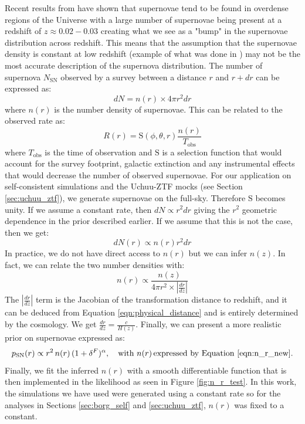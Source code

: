 Recent results from \cite{Lordet_2026} have shown that supernovae tend to be found in overdense regions of the Universe with a large number of supernovae being present at a 
redshift of $z \approx 0.02-0.03$ creating what we see as a "bump" in the supernovae distribution across redshift. This means that the assumption that the supernovae density is 
constant at low redshift (example of what was done in \cite{Perley_2020}) may not be the most accurate description of the supernova distribution. The number of supernova 
$N_{\text{SN}}$ observed by a survey between a distance $r$ and $r+dr$ can be expressed as:
\begin{equation}
    dN = n(r) \times 4 \pi r^2 dr
\end{equation}
where $n(r)$ is the number density of supernovae. This can be related to the observed rate as:
\begin{equation}
    R(r) = \mathrm{S}(\phi, \theta, r) \frac{n(r)}{T_{\text{obs}}}
\end{equation}
where $T_{\text{obs}}$ is the time of observation and $\mathrm{S}$ is a selection function that would account for the survey footprint, galactic extinction and any 
instrumental effects that would decrease the number of observed supernovae. For our application on self-consistent simulations and the 
Uchuu-ZTF mocks (see Section \ref{sec:uchuu_ztf}), we generate supernovae on the full-sky. Therefore $\mathrm{S}$ becomes unity. 
If we assume a constant rate, then $dN \propto r^2 dr$ giving the $r^2$ geometric dependence in the prior described earlier. 
If we assume that this is not the case, then we get:
\begin{equation}
    dN(r) \propto n(r)r^2 dr
\end{equation}
In practice, we do not have direct access to $n(r)$ but we can infer $n(z)$. In fact, we can relate the two number densities with:
\begin{equation}
    n(r) \propto \frac{n(z)}{4\pi r^2 \times |\frac{dr}{dz}|}
    \label{eqn:n_r_new}
\end{equation}
The $|\frac{dr}{dz}|$ term is the Jacobian of the transformation distance to redshift, and it can be deduced from Equation \ref{eqn:physical_distance} and is entirely 
determined by the cosmology. We get $\frac{dr}{dz} = \frac{c}{H(z)}$. Finally, we can present a more realistic prior on supernovae expressed as:
\begin{equation}
    p_{\text{SN}}(r) \propto r^2\, n(r)\,(1+\delta^F)^{\alpha},
    \quad \text{with } n(r) \, \text{expressed by Equation \ref{eqn:n_r_new}}.
    \label{eqn:new_prior}
\end{equation}
Finally, we fit the inferred $n(r)$ with a smooth differentiable function that is then implemented in the likelihood as seen in Figure \ref{fig:n_r_test}. 
In this work, the simulations we have used were generated using a constant rate so for the analyses in Sections \ref{sec:borg_self} and \ref{sec:uchuu_ztf}, $n(r)$ was fixed to 
a constant. 

